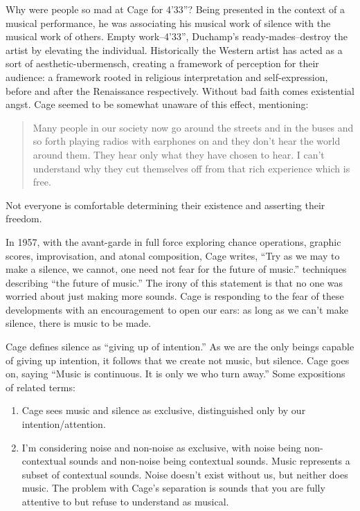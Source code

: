 \documentclass{thesis}
\begin{document}
	Why were people so mad at Cage for 4'33''? Being presented in the context of a musical performance, he was associating his musical work of silence with the musical work of others. Empty work--4'33'', Duchamp's ready-mades--destroy the artist by elevating the individual. Historically the Western artist has acted as a sort of aesthetic-ubermensch, creating a framework of perception for their audience: a framework rooted in religious interpretation and self-expression, before and after the Renaissance respectively. Without bad faith comes existential angst. Cage seemed to be somewhat unaware of this effect, mentioning:
	
\begin{quote}
	Many people in our society now go around the streets and in the buses and so forth playing radios with earphones on and they don't hear the world around them. They hear only what they have chosen to hear. I can't understand why they cut themselves off from that rich experience which is free.
\end{quote}

	Not everyone is comfortable determining their existence and asserting their freedom.
	
	In 1957, with the avant-garde in full force exploring chance operations, graphic scores, improvisation, and atonal composition, Cage writes, ``Try as we may to make a silence, we cannot, one need not fear for the future of music.''  techniques describing ``the future of music.'' The irony of this statement is that no one was worried about just making more sounds. Cage is responding to the fear of these developments with an encouragement to open our ears: as long as we can't make silence, there is music to be made.
	
	Cage defines silence as ``giving up of intention.'' As we are the only beings capable of giving up intention, it follows that we create not music, but silence. Cage goes on, saying ``Music is continuous. It is only we who turn away.'' Some expositions of related terms:
		
\begin{enumerate}
	\item Cage sees music and silence as exclusive, distinguished only by our intention/attention.
	\item I'm considering noise and non-noise as exclusive, with noise being non-contextual sounds and non-noise being contextual sounds. Music represents a subset of contextual sounds. Noise doesn't exist without us, but neither does music. The problem with Cage's separation is sounds that you are fully attentive to but refuse to understand as musical.
\end{enumerate}
\end{document}
